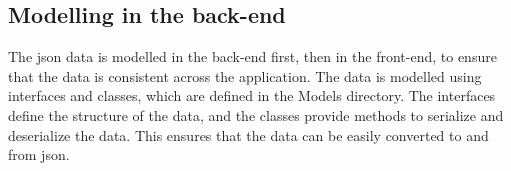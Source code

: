 
\subsection{Modelling in the back-end}
The \acrshort{json} data is modelled in the back-end first, then in the front-end, to ensure that the data is consistent across the
application. The data is modelled using interfaces and classes, which are defined in the Models directory. The interfaces define the
structure of the data, and the classes provide methods to serialize and deserialize the data. This ensures that the data can be easily
converted to and from \acrshort{json}.


